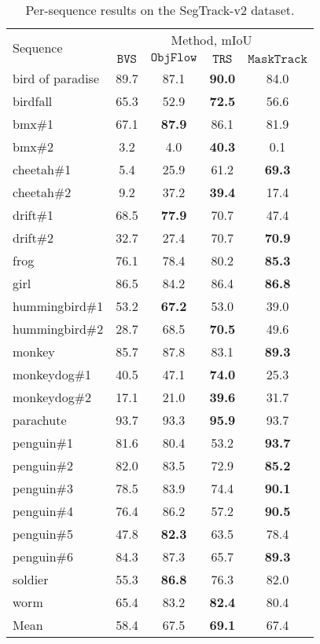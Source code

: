 \documentclass[10pt,twocolumn,letterpaper]{article}
\begin{document}
\begin{table}[h]
\begin{centering}
\begingroup
\begin{tabular}{l@{  }|@{   }c@{   }c@{   }c@{   }c@{   }}
\multirow{2}{*}{Sequence} & \multicolumn{4}{c}{Method, mIoU}\\
& $\mathtt{BVS}$ \cite{Maerki2016Cvpr} & $\mathtt{ObjFlow}$ \cite{Tsai2016Cvpr}& $\mathtt{TRS}$ \cite{Xiao2016Cvpr} & $\mathtt{MaskTrack}$ \tabularnewline
\hline
\hline
bird of paradise & 89.7 & 87.1 & \bf 90.0 &84.0 \\
birdfall & 65.3 & 52.9 &  \bf 72.5& 56.6 \\
bmx\#1 & 67.1 &  \bf 87.9 & 86.1 &81.9 \\
bmx\#2 & 3.2 & 4.0 & \bf  40.3 & 0.1 \\
cheetah\#1 & 5.4 & 25.9 & 61.2 &  \bf 69.3 \\
cheetah\#2 & 9.2 & 37.2 &  \bf 39.4 & 17.4 \\
drift\#1 & 68.5 & \bf  77.9 & 70.7 & 47.4 \\
drift\#2 & 32.7 & 27.4 & 70.7 &  \bf 70.9 \\
frog & 76.1 & 78.4 & 80.2 &  \bf  85.3 \\
girl & 86.5 & 84.2 & 86.4 &  \bf 86.8 \\
hummingbird\#1 & 53.2 & \bf  67.2 & 53.0 & 39.0 \\
hummingbird\#2 & 28.7 & 68.5 &  \bf 70.5 & 49.6 \\
monkey & 85.7 & 87.8 & 83.1 &  \bf 89.3 \\
monkeydog\#1 & 40.5 & 47.1 &  \bf 74.0 & 25.3 \\
monkeydog\#2 & 17.1 & 21.0 &  \bf 39.6 & 31.7 \\
parachute & 93.7 & 93.3 &  \bf 95.9 & 93.7 \\
penguin\#1 & 81.6 & 80.4 & 53.2 &  \bf 93.7 \\
penguin\#2 & 82.0 & 83.5 & 72.9 &  \bf 85.2 \\
penguin\#3 & 78.5 & 83.9 & 74.4 &  \bf 90.1 \\
penguin\#4 & 76.4 & 86.2 & 57.2 & \bf  90.5 \\
penguin\#5 & 47.8 &  \bf 82.3 & 63.5 & 78.4 \\
penguin\#6 & 84.3 & 87.3 & 65.7 &  \bf 89.3 \\
soldier & 55.3 & \bf  86.8 & 76.3 & 82.0 \\
worm & 65.4 & 83.2 & \bf  82.4 &80.4 \\
\hline
Mean  &  58.4   &     67.5  & \bf 69.1 & 67.4   \\
\end{tabular}\endgroup
\par\end{centering}
\caption{\label{tab:segtrack_seq}Per-sequence results on the SegTrack-v2 dataset.}
\end{table}
\end{document}
